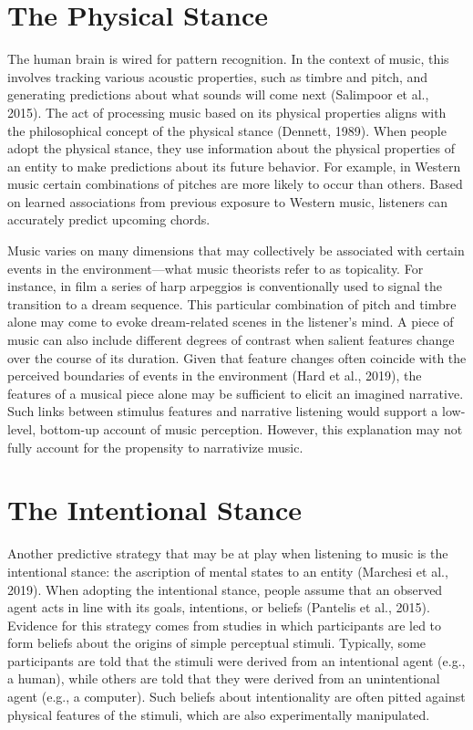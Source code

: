 \documentclass[12pt,twoside]{reedthesis}
\begin{document}
\section*{The Physical Stance}
The human brain is wired for pattern recognition. In the context of music, this involves tracking various acoustic properties, such as timbre and pitch, and generating predictions about what sounds will come next (Salimpoor et al., 2015). The act of processing music based on its physical properties aligns with the philosophical concept of the physical stance (Dennett, 1989). When people adopt the physical stance, they use information about the physical properties of an entity to make predictions about its future behavior. For example, in Western music certain combinations of pitches are more likely to occur than others. Based on learned associations from previous exposure to Western music, listeners can accurately predict upcoming chords. 

Music varies on many dimensions that may collectively be associated with certain events in the environment—what music theorists refer to as topicality. For instance, in film a series of harp arpeggios is conventionally used to signal the transition to a dream sequence. This particular combination of pitch and timbre alone may come to evoke dream-related scenes in the listener’s mind. A piece of music can also include different degrees of contrast when salient features change over the course of its duration. Given that feature changes often coincide with the perceived boundaries of events in the environment (Hard et al., 2019), the features of a musical piece alone may be sufficient to elicit an imagined narrative. Such links between stimulus features and narrative listening would support a low-level, bottom-up account of music perception. However, this explanation may not fully account for the propensity to narrativize music. 

\section*{The Intentional Stance}
Another predictive strategy that may be at play when listening to music is the intentional stance: the ascription of mental states to an entity (Marchesi et al., 2019). When adopting the intentional stance, people assume that an observed agent acts in line with its goals, intentions, or beliefs (Pantelis et al., 2015). Evidence for this strategy comes from studies in which participants are led to form beliefs about the origins of simple perceptual stimuli. Typically, some participants are told that the stimuli were derived from an intentional agent (e.g., a human), while others are told that they were derived from an unintentional agent (e.g., a computer). Such beliefs about intentionality are often pitted against physical features of the stimuli, which are also experimentally manipulated.
\end{document}
